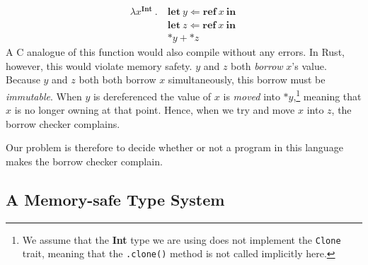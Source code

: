 \documentclass{article}
\newcommand{\mkref}{\textbf{ref}~}
\newcommand{\deref}{\mathbf{*}}
\begin{document}
\begin{align*}
    \lambda x^{\textbf{Int}} ~.~ &\textbf{let}~ y \Leftarrow \mkref x ~\textbf{in}~\\ 
    &\textbf{let}~ z \Leftarrow \mkref x ~\textbf{in}~\\ 
    &\deref y + \deref z
\end{align*}
A C analogue of this function would also compile without any errors. In Rust, however, this would violate memory safety. $y$ and $z$ both \textit{borrow} $x$'s value. Because $y$ and $z$ both both borrow $x$ simultaneously, this borrow must be \textit{immutable}. When $y$ is dereferenced the value of $x$ is \textit{moved} into $\deref y$,\footnote{We assume that the \textbf{Int} type we are using does not implement the \texttt{Clone} trait, meaning that the \texttt{.clone()} method is not called implicitly here.} meaning that $x$ is no longer owning at that point. Hence, when we try and move $x$ into $z$, the borrow checker complains. 

Our problem is therefore to decide whether or not a program in this language makes the borrow checker complain.

\subsection{A Memory-safe Type System}
\end{document}

